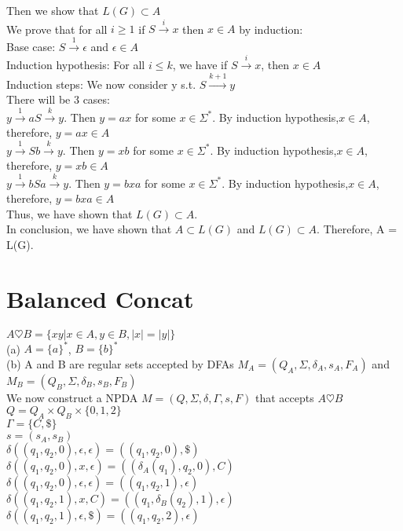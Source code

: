 \documentclass[12pt]{article}
\begin{document}
Then we show that $L(G) \subset A$\\
We prove that for all $i\ge 1$ if $S\xrightarrow{i} x$ then $x\in A$ by induction:\\
Base case: $S\xrightarrow1 \epsilon$  and $\epsilon\in A$\\
Induction hypothesis: For all $i\le k$, we have if $S\xrightarrow{i} x$, then $x\in A$\\
Induction steps: We now consider y s.t. $S\xrightarrow{k+1} y$\\
There will be 3 cases:\\
$y\xrightarrow1 aS\xrightarrow{k}y$. Then $y = ax$ for some $x\in\Sigma^*$. By induction hypothesis,$x\in A$, therefore, $y = ax \in A$\\
$y\xrightarrow1 Sb\xrightarrow{k}y$. Then $y = xb$ for some $x\in\Sigma^*$. By induction hypothesis,$x\in A$, therefore, $y = xb \in A$\\
$y\xrightarrow1 bSa\xrightarrow{k}y$. Then $y = bxa$ for some $x\in\Sigma^*$. By induction hypothesis,$x\in A$, therefore, $y = bxa \in A$\\
Thus, we have shown that $L(G) \subset A$.\\

In conclusion, we have shown that $A \subset L(G)$ and $L(G) \subset A$. Therefore, A = L(G).


\pagebreak
\section{Balanced Concat}

$A\heartsuit B = \{xy | x \in A,y \in B,|x| = |y|\}$\\

(a) $A = \{a\}^*$, $B = \{b\}^*$\\

(b) A and B are regular sets accepted by DFAs $M_A = (Q_A,\Sigma,\delta_A,s_A,F_A)$ and $M_B = (Q_B,\Sigma,\delta_B,s_B,F_B)$\\
We now construct a NPDA $M =(Q,\Sigma,\delta,\Gamma,s,F)$ that accepts $A\heartsuit B$\\

$Q = Q_A \times Q_B \times \{0,1,2\}$\\
$\Gamma = \{C,\$\}$\\
$s = (s_A,s_B)$\\

$\delta((q_1,q_2,0),\epsilon,\epsilon)  = ((q_1,q_2,0),\$)$\\
$\delta((q_1,q_2,0),x,\epsilon) = ((\delta_A(q_1),q_2,0),C)$\\
$\delta((q_1,q_2,0),\epsilon,\epsilon) = ((q_1,q_2,1),\epsilon)$\\
$\delta((q_1,q_2,1),x,C) = ((q_1,\delta_B(q_2),1),\epsilon)$\\
$\delta((q_1,q_2,1),\epsilon,\$) = ((q_1,q_2,2),\epsilon)$\\
\end{document}
